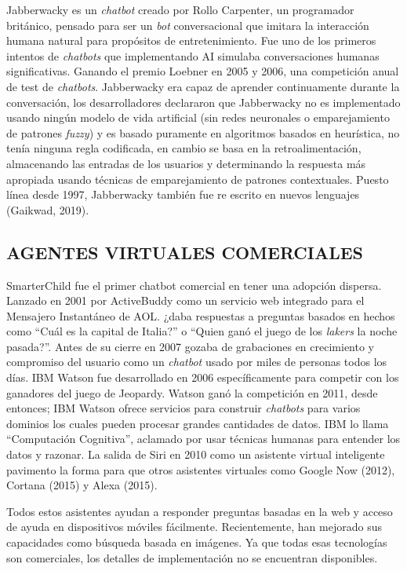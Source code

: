 \documentclass[letter, openright, 12pt]{book}
\begin{document}
Jabberwacky es un \textit{chatbot} creado por Rollo Carpenter, un programador británico, pensado para ser un \textit{bot} conversacional que imitara la interacción humana natural para propósitos de entretenimiento. Fue uno de los primeros intentos de \textit{chatbots} que implementando AI simulaba conversaciones humanas significativas. Ganando el premio Loebner en 2005 y 2006, una competición anual de test de \textit{chatbots}. Jabberwacky era capaz de aprender continuamente durante la conversación, los desarrolladores declararon que Jabberwacky no es implementado usando ningún modelo de vida artificial (sin redes neuronales o emparejamiento de patrones \textit{fuzzy}) y es basado puramente en algoritmos basados en heurística, no tenía ninguna regla codificada, en cambio se basa en la retroalimentación, almacenando las entradas de los usuarios y determinando la respuesta más apropiada usando técnicas de emparejamiento de patrones contextuales. Puesto línea desde 1997, Jabberwacky también fue re escrito en nuevos lenguajes (Gaikwad, 2019).

\subsection{AGENTES VIRTUALES COMERCIALES}
SmarterChild fue el primer chatbot comercial en tener una adopción dispersa. Lanzado en 2001 por ActiveBuddy como un servicio web integrado para el Mensajero Instantáneo de AOL. ¿daba respuestas a preguntas basados en hechos como “Cuál es la capital de Italia?” o “Quien ganó el juego de los \textit{lakers} la noche pasada?”. Antes de su cierre en 2007 gozaba de grabaciones en crecimiento y compromiso del usuario como un \textit{chatbot} usado por miles de personas todos los días. IBM Watson fue desarrollado en 2006 específicamente para competir con los ganadores del juego de Jeopardy. Watson ganó la competición en 2011, desde entonces; IBM Watson ofrece servicios para construir \textit{chatbots} para varios dominios los cuales pueden procesar grandes cantidades de datos. IBM lo llama “Computación Cognitiva”, aclamado por usar técnicas humanas para entender los datos y razonar. La salida de Siri en 2010 como un asistente virtual inteligente pavimento la forma para que otros asistentes virtuales como Google Now (2012), Cortana (2015) y Alexa (2015). \par
Todos estos asistentes ayudan a responder preguntas basadas en la web y acceso de ayuda en dispositivos móviles fácilmente. Recientemente, han mejorado sus capacidades como búsqueda basada en imágenes. Ya que todas esas tecnologías son comerciales, los detalles de implementación no se encuentran disponibles.
\end{document}
